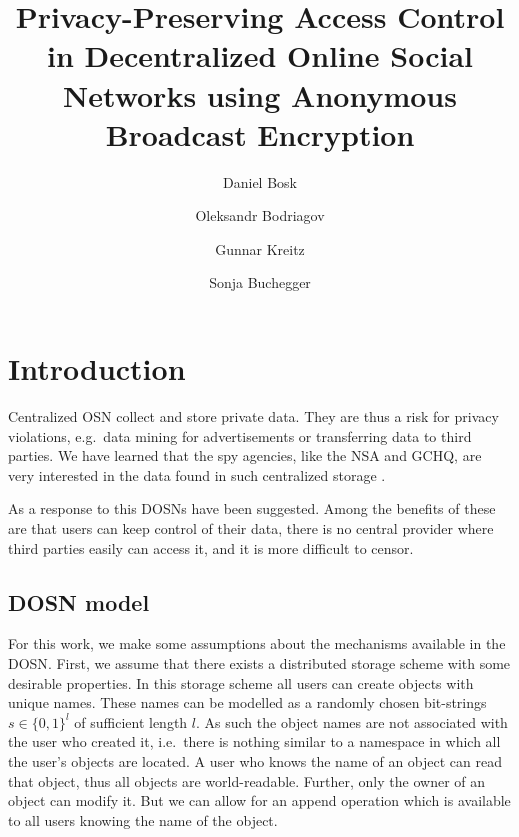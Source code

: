 \title{%
  Privacy-Preserving Access Control in
  Decentralized Online Social Networks using
  Anonymous Broadcast Encryption
}
\author{%
  Daniel Bosk \and
  Oleksandr Bodriagov \and
  Gunnar Kreitz \and
  Sonja Buchegger
}

\maketitle

\acresetall
\section{Introduction}

Centralized \ac{OSN} collect and store private data.
They are thus a risk for privacy violations, e.g.~data mining for 
advertisements or transferring data to third parties.
We have learned that the spy agencies, like the \ac{NSA} and \ac{GCHQ}, are 
very interested in the data found in such centralized storage \cite{prism}.

As a response to this \acp{DOSN} have been suggested.
Among the benefits of these are that users can keep control of their data, 
there is no central provider where third parties easily can access it, and it 
is more difficult to censor.

\subsection{\acs{DOSN} model}

For this work, we make some assumptions about the mechanisms available in the 
\ac{DOSN}.
First, we assume that there exists a distributed storage scheme with some 
desirable properties.
In this storage scheme all users can create objects with unique names.
These names can be modelled as a randomly chosen bit-strings \(s\in \{0, 
1\}^l\) of sufficient length \(l\).
As such the object names are not associated with the user who created it, 
i.e.~there is nothing similar to a namespace in which all the user's objects 
are located.
A user who knows the name of an object can read that object, thus all objects 
are world-readable.
Further, only the owner of an object can modify it.
But we can allow for an append operation which is available to all users 
knowing the name of the object.

